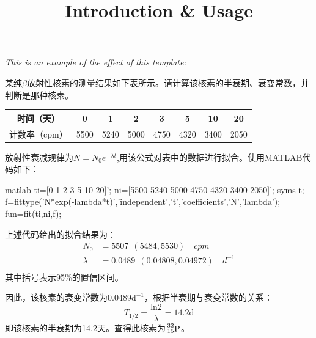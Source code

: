 




\duedate{\today}



\title{\vspace{-1cm} \textbf{Introduction \& Usage} \vspace{-0.5cm}}
\date{}
\inlinemaketitle


\textit{This is an example of the effect of this template:} \\
\vspace{1cm}

\begin{problem}[0]
某纯$\beta$放射性核素的测量结果如下表所示。请计算该核素的半衰期、衰变常数，并判断是那种核素。

    \begin{table}[H]
    \centering
    \label{表格}
    \begin{tabular}{|c|c|c|c|c|c|c|c|}
    \hline
    时间（天） & 0 & 1 & 2 & 3 & 5 & 10 & 20 \\
    \hline
    计数率（cpm） & 5500 & 5240 & 5000 & 4750 & 4320 & 3400 & 2050 \\
    \hline
    \end{tabular}
    \end{table}

\end{problem}

\begin{solution}
  \par
  放射性衰减规律为$N=N_0 e^{-\lambda t}$,用该公式对表中的数据进行拟合。使用MATLAB代码如下：
  \par
\begin{myminted}{matlab}
ti=[0 1 2 3 5 10 20]';
ni=[5500 5240 5000 4750 4320 3400 2050]';
syms t;
f=fittype('N*exp(-lambda*t)','independent','t','coefficients',{'N','lambda'});
fun=fit(ti,ni,f);
\end{myminted}
  \par
  上述代码给出的拟合结果为：
	\[\begin{split}
		N_0     &  = 5507\ \ (5484, 5530) \quad \si{cpm} \\
		\lambda &  = 0.0489\ \ (0.04808, 0.04972) \quad \si{d^{-1}} \\
	\end{split}\]
  其中括号表示95\%的置信区间。
  \par
  因此，该核素的衰变常数为$0.0489 \text{d}^{-1}$，根据半衰期与衰变常数的关系：
	\[T_{1/2}=\frac{\text{ln}2}{\lambda}=14.2  \text{d}\]
  即该核素的半衰期为14.2天。查得此核素为$\sideset{^{32}_{15}}{}{\mathop{\mathrm{P}}}$。
\end{solution}

